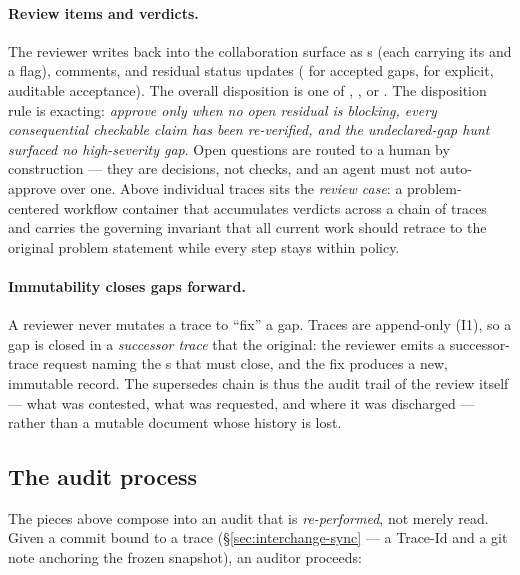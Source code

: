 \paragraph{Review items and verdicts.} The reviewer writes back into the collaboration surface as
s (each carrying its  and a  flag), comments, and residual
status updates ( for accepted gaps,  for explicit, auditable
acceptance). The overall disposition is one of , , or
. The disposition rule is exacting: \emph{approve only when no open residual is
blocking, every consequential checkable claim has been re-verified, and the undeclared-gap hunt surfaced no
high-severity gap}. Open questions are routed to a human by construction --- they are decisions, not checks,
and an agent must not auto-approve over one. Above individual traces sits the \emph{review case}: a
problem-centered workflow container that accumulates verdicts across a chain of traces and carries the
governing invariant that all current work should retrace to the original problem statement while every step
stays within policy.

\paragraph{Immutability closes gaps forward.} A reviewer never mutates a trace to ``fix'' a gap. Traces are
append-only (I1), so a gap is closed in a \emph{successor trace} that  the original: the
reviewer emits a successor-trace request naming the s that must close, and the fix produces
a new, immutable record. The supersedes chain is thus the audit trail of the review itself --- what was
contested, what was requested, and where it was discharged --- rather than a mutable document whose history is
lost.

\subsection{The audit process}\label{sec:interchange-process}

The pieces above compose into an audit that is \emph{re-performed}, not merely read. Given a commit bound to
a trace (\S\ref{sec:interchange-sync} --- a Trace-Id and a git note anchoring the frozen snapshot), an
auditor proceeds:

